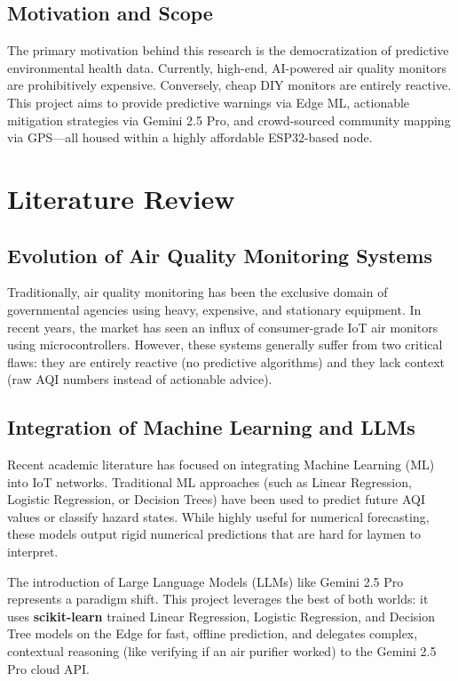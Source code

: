 \documentclass[12pt,a4paper]{report}
\begin{document}
\section{Motivation and Scope}
The primary motivation behind this research is the democratization of predictive environmental health data. Currently, high-end, AI-powered air quality monitors are prohibitively expensive. Conversely, cheap DIY monitors are entirely reactive. This project aims to provide predictive warnings via Edge ML, actionable mitigation strategies via Gemini 2.5 Pro, and crowd-sourced community mapping via GPS—all housed within a highly affordable ESP32-based node.

\chapter{Literature Review}
\section{Evolution of Air Quality Monitoring Systems}
Traditionally, air quality monitoring has been the exclusive domain of governmental agencies using heavy, expensive, and stationary equipment. In recent years, the market has seen an influx of consumer-grade IoT air monitors using microcontrollers. However, these systems generally suffer from two critical flaws: they are entirely reactive (no predictive algorithms) and they lack context (raw AQI numbers instead of actionable advice).

\section{Integration of Machine Learning and LLMs}
Recent academic literature has focused on integrating Machine Learning (ML) into IoT networks. Traditional ML approaches (such as Linear Regression, Logistic Regression, or Decision Trees) have been used to predict future AQI values or classify hazard states. While highly useful for numerical forecasting, these models output rigid numerical predictions that are hard for laymen to interpret.

The introduction of Large Language Models (LLMs) like Gemini 2.5 Pro represents a paradigm shift. This project leverages the best of both worlds: it uses \textbf{scikit-learn} trained Linear Regression, Logistic Regression, and Decision Tree models on the Edge for fast, offline prediction, and delegates complex, contextual reasoning (like verifying if an air purifier worked) to the Gemini 2.5 Pro cloud API.
\end{document}
